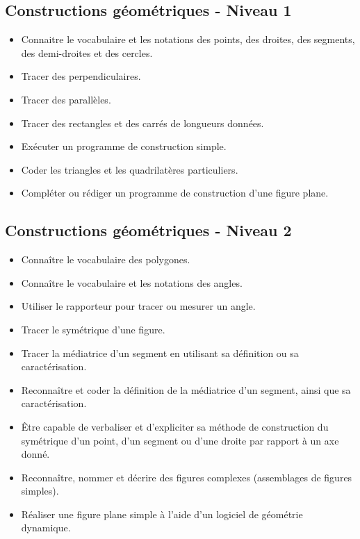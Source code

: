 \documentclass[a4paper,12pt,fleqn]{article}		
\begin{document}
\renewcommand{\labelitemi}{}

\subsection*{Constructions géométriques - Niveau 1}

\begin{itemize}
	\item {}Connaitre le vocabulaire et les notations des points, des droites, des segments, des demi-droites et des cercles. 
	\item {}Tracer des perpendiculaires.
	\item {}Tracer des parallèles.
	\item {}Tracer des rectangles et des carrés de longueurs données.
	\item {}Exécuter un programme de construction simple.
	\item {}Coder les triangles et les quadrilatères particuliers.
	\item {}Compléter ou rédiger un programme de construction d’une figure plane.
\end{itemize}

\subsection*{Constructions géométriques - Niveau 2}

\begin{itemize}
	\item {}Connaître le vocabulaire des polygones.
	\item {}Connaître le vocabulaire et les notations des angles. %
	\item {}Utiliser le rapporteur pour tracer ou mesurer un angle.
	\item {}Tracer le symétrique d’une figure. %
	\item {}Tracer la médiatrice d’un segment en utilisant sa définition ou sa caractérisation.
	\item {}Reconnaître et coder la définition de la médiatrice d’un segment, ainsi que sa caractérisation.
	\item {}Être capable de verbaliser et d’expliciter sa méthode de construction du symétrique d’un point, d’un segment ou d’une droite par rapport à un axe donné.
	\item {}Reconnaître, nommer et décrire des figures complexes (assemblages de figures simples).
	\item {}Réaliser une figure plane simple à l’aide d’un logiciel de géométrie dynamique.
\end{itemize}
\end{document}
